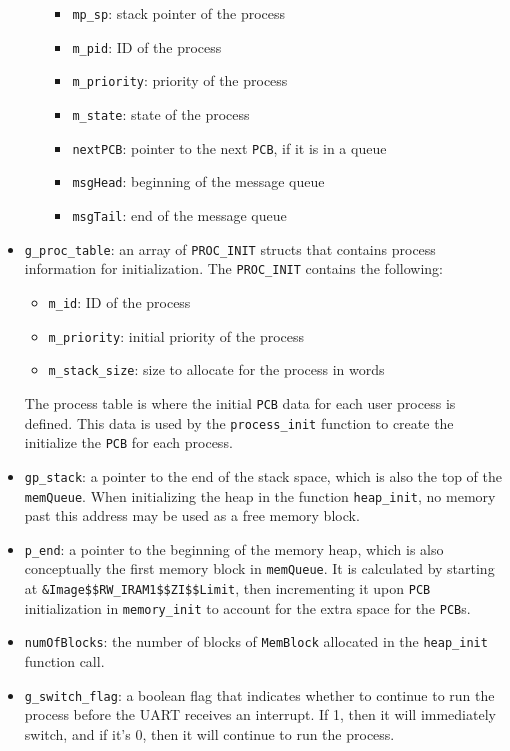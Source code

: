 \documentclass[12pt]{report}
\begin{document}
\begin{itemize}
\begin{itemize}
        \begin{itemize}
          \item \texttt{mp_sp}: stack pointer of the process
          \item \texttt{m_pid}: ID of the process
          \item \texttt{m_priority}: priority of the process
          \item \texttt{m_state}: state of the process
          \item \texttt{nextPCB}: pointer to the next \texttt{PCB}, if it is in a queue
          \item \texttt{msgHead}: beginning of the message queue
          \item \texttt{msgTail}: end of the message queue
        \end{itemize}
    \end{itemize}
  \item \texttt{g_proc_table}: an array of \texttt{PROC_INIT} structs that contains process information for initialization. The \texttt{PROC_INIT} contains the following:
    \begin{itemize}
      \item \texttt{m_id}: ID of the process
      \item \texttt{m_priority}: initial priority of the process
      \item \texttt{m_stack_size}: size to allocate for the process in words
    \end{itemize}
  The process table is where the initial \texttt{PCB} data for each user process is defined.  This data is used by the \texttt{process_init} function to create the initialize the \texttt{PCB} for each process.
    \item \texttt{gp_stack}: a pointer to the end of the stack space, which is also the top of the \texttt{memQueue}. When initializing the heap in the function \texttt{heap_init}, no memory past this address may be used as a free memory block.
  \item \texttt{p_end}: a pointer to the beginning of the memory heap, which is also conceptually the first memory block in \texttt{memQueue}. It is calculated by starting at \texttt{\&Image\$\$RW_IRAM1\$\$ZI\$\$Limit}, then incrementing it upon \texttt{PCB} initialization in \texttt{memory_init} to account for the extra space for the \texttt{PCB}s.
  \item \texttt{numOfBlocks}: the number of blocks of \texttt{MemBlock} allocated in the \texttt{heap_init} function call.
  \item \texttt{g_switch_flag}: a boolean flag that indicates whether to continue to run the process before the UART receives an interrupt. If 1, then it will immediately switch, and if it's 0, then it will continue to run the process.

\end{itemize}
\end{document}

